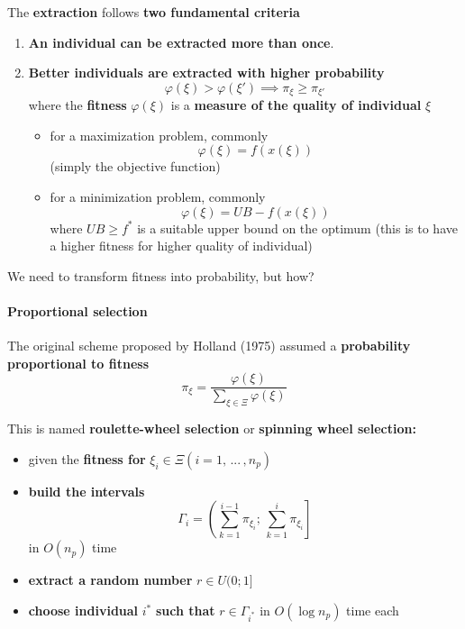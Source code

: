 \documentclass[11pt]{article}
\begin{document}
	The \textbf{extraction} follows \textbf{two fundamental criteria}
	\begin{enumerate}
		\item \textbf{An individual can be extracted more than once}.\\
			
		\item \textbf{Better individuals are extracted with higher probability}
		$$ \varphi (\xi) > \varphi (\xi') \implies \pi_{\xi} \geq \pi_{\xi'} $$
		where the \textbf{fitness} $\varphi (\xi)$ is a \textbf{measure of the quality of individual} $\xi$
		\begin{itemize}
			\item for a maximization problem, commonly
			$$ \varphi (\xi) = f (x(\xi)) $$
			(simply the objective function)
				
			\item for a minimization problem, commonly
			$$ \varphi (\xi) = UB - f (x (\xi)) $$
			where $UB \geq f^\ast$ is a suitable upper bound on the optimum (this is to have a higher fitness for higher quality of individual)
		\end{itemize}
	\end{enumerate}
	
	We need to transform fitness into probability, but how? \\
	
	\newpage
	
	\paragraph{Proportional selection}
	The original scheme proposed by Holland (1975) assumed a \textbf{probability proportional to fitness}
	$$ \pi_{\xi} = \frac{\varphi (\xi)}{\sum_{\xi \in \Xi} \varphi (\xi)} $$
	
	This is named \textbf{roulette-wheel selection} or \textbf{spinning wheel selection:}
	\begin{itemize}
		\item given the \textbf{fitness for} $\xi_i \in \Xi (i = 1, \, ... \, , n_p )$
		
		\item \textbf{build the intervals} 
		$$ \Gamma_i = \left( \sum_{k=1}^{i-1} \pi_{\xi_i}; \, \sum_{k=1}^{i} \pi_{\xi_i} \right] $$
		in $O (n_p )$ time
		
		\item \textbf{extract a random number} $r \in U (0; 1]$
		
		\item \textbf{choose individual} $i^\ast$ \textbf{such that} $r \in \Gamma_{i^\ast}$ in $O (\log n_p )$ time each
	\end{itemize}
	
\end{document}
